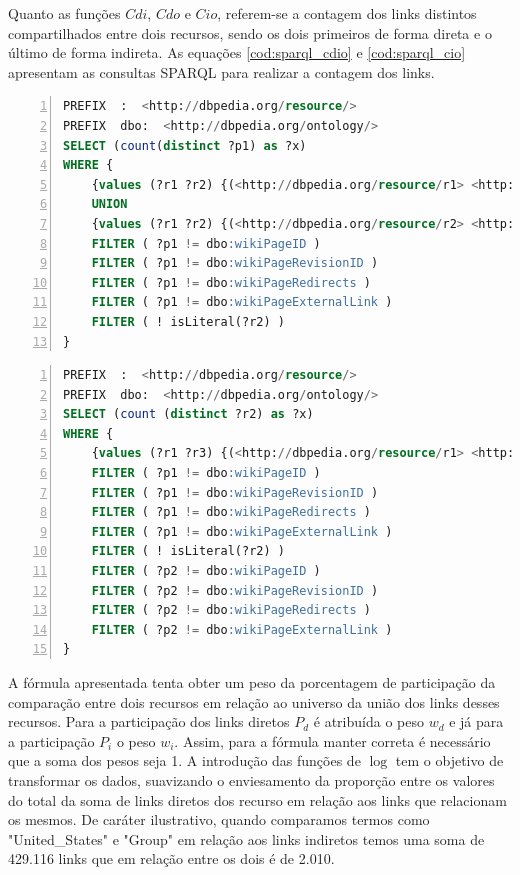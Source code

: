 Quanto as funções $Cdi$, $Cdo$ e $Cio$, referem-se a contagem dos links distintos compartilhados entre dois recursos, sendo os dois primeiros de forma direta e o último de forma indireta. As equações \ref{cod:sparql_cdio} e \ref{cod:sparql_cio} apresentam as consultas \ac{SPARQL} para realizar a contagem dos links.

\begin{lstlisting}[caption=Consulta SPARQL para contagem de links diretos (saíntes e entrantes) entre dois recursos, language=SQL, frame=single, label={cod:sparql_cdio}, float, numbers=left]
PREFIX  :  <http://dbpedia.org/resource/>
PREFIX  dbo:  <http://dbpedia.org/ontology/>
SELECT (count(distinct ?p1) as ?x)
WHERE {
	{values (?r1 ?r2) {(<http://dbpedia.org/resource/r1> <http://dbpedia.org/resource/France>)} ?r1 ?p1 ?r2 . FILTER (?r1 != ?r2) }
	UNION
	{values (?r1 ?r2) {(<http://dbpedia.org/resource/r2> <http://dbpedia.org/resource/Paris>)} ?r1 ?p1 ?r2 . FILTER (?r1 != ?r2) }
	FILTER ( ?p1 != dbo:wikiPageID )
	FILTER ( ?p1 != dbo:wikiPageRevisionID )
	FILTER ( ?p1 != dbo:wikiPageRedirects )
	FILTER ( ?p1 != dbo:wikiPageExternalLink )
	FILTER ( ! isLiteral(?r2) )
}
\end{lstlisting}

\begin{lstlisting}[caption=Consulta SPARQL para contagem de links indiretos (saíntes) entre dois recursos, language=SQL, frame=single, label={cod:sparql_cio}, float, numbers=left]
PREFIX  :  <http://dbpedia.org/resource/>
PREFIX  dbo:  <http://dbpedia.org/ontology/>
SELECT (count (distinct ?r2) as ?x)
WHERE {
	{values (?r1 ?r3) {(<http://dbpedia.org/resource/r1> <http://dbpedia.org/resource/r2>)} ?r2 ?p1 ?r1 . ?r2 ?p2 ?r3 . FILTER (?r1 != ?r3 && ?r2 != ?r1 && ?r2 != ?r3)}
	FILTER ( ?p1 != dbo:wikiPageID )
	FILTER ( ?p1 != dbo:wikiPageRevisionID )
	FILTER ( ?p1 != dbo:wikiPageRedirects )
	FILTER ( ?p1 != dbo:wikiPageExternalLink )
	FILTER ( ! isLiteral(?r2) )
	FILTER ( ?p2 != dbo:wikiPageID )
	FILTER ( ?p2 != dbo:wikiPageRevisionID )
	FILTER ( ?p2 != dbo:wikiPageRedirects )
	FILTER ( ?p2 != dbo:wikiPageExternalLink )
}
\end{lstlisting}

A fórmula apresentada tenta obter um peso da porcentagem de participação da comparação entre dois recursos em relação ao universo da união dos links desses recursos. Para a participação dos links diretos $P_d$ é atribuída o peso $w_d$ e já para a participação $P_i$ o peso $w_i$. Assim, para a fórmula manter correta é necessário que a soma dos pesos seja 1. A introdução das funções de $\log$ tem o objetivo de transformar os dados, suavizando o enviesamento da proporção entre os valores do total da soma de links diretos dos recurso em relação aos links que relacionam os mesmos. De caráter ilustrativo, quando comparamos termos como "United\_States" e "Group" em relação aos links indiretos temos uma soma de 429.116 links que em relação entre os dois é de 2.010.

